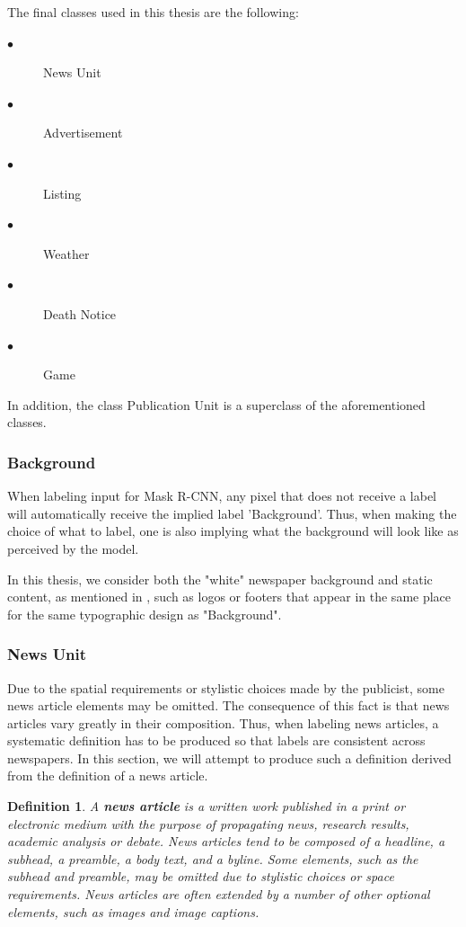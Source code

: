 \documentclass[oneside, english, bibtex]{kththesis}
\begin{document}
The final classes used in this thesis are the following:

\begin{description}
\item[$\bullet$] News Unit
\item[$\bullet$] Advertisement
\item[$\bullet$] Listing
\item[$\bullet$] Weather
\item[$\bullet$] Death Notice
\item[$\bullet$] Game
\end{description}

In addition, the class Publication Unit is a superclass of the aforementioned classes.

\subsubsection{Background}

When labeling input for Mask R-CNN, any pixel that does not receive a label will automatically receive the implied label 'Background'.
Thus, when making the choice of what to label, one is also implying what the background will look like as perceived by the model.

In this thesis, we consider both the "white" newspaper background and static content, as mentioned in , such as logos or footers that appear in the same place for the same typographic design as "Background".

\subsubsection{News Unit}
\label{subsub:labelnewsunit}

Due to the spatial requirements or stylistic choices made by the publicist, some news article elements may be omitted.
The consequence of this fact is that news articles vary greatly in their composition.
Thus, when labeling news articles, a systematic definition has to be produced so that labels are consistent across newspapers.
In this section, we will attempt to produce such a definition derived from the definition of a news article.

\newtheorem{lemma}{Lemma}[chapter]
\newcommand{\lemmaautorefname}{Lemma}
\newtheorem{definition}[lemma]{Definition}
\newcommand{\definitionautorefname}{Definition}

\begin{definition}
\label{newsarticle}
A \textbf{news article} is a written work published in a print or electronic medium with the purpose of propagating news, research results, academic analysis or debate.
News articles tend to be composed of a headline, a subhead, a preamble, a body text, and a byline.
Some elements, such as the subhead and preamble, may be omitted due to stylistic choices or space requirements.
News articles are often extended by a number of other optional elements, such as images and image captions.
\end{definition}
\end{document}
